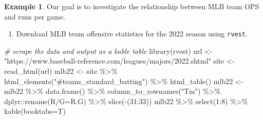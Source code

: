\documentclass[
  11pt,
]{book}
\newenvironment{Shaded}{\begin{snugshade}}{\end{snugshade}}
\newcommand{\AttributeTok}[1]{\textcolor[rgb]{0.77,0.63,0.00}{#1}}
\newcommand{\CommentTok}[1]{\textcolor[rgb]{0.56,0.35,0.01}{\textit{#1}}}
\newcommand{\DecValTok}[1]{\textcolor[rgb]{0.00,0.00,0.81}{#1}}
\newcommand{\FunctionTok}[1]{\textcolor[rgb]{0.00,0.00,0.00}{#1}}
\newcommand{\NormalTok}[1]{#1}
\newcommand{\OtherTok}[1]{\textcolor[rgb]{0.56,0.35,0.01}{#1}}
\newcommand{\SpecialCharTok}[1]{\textcolor[rgb]{0.00,0.00,0.00}{#1}}
\newcommand{\StringTok}[1]{\textcolor[rgb]{0.31,0.60,0.02}{#1}}
\providecommand{\tightlist}{%
  \setlength{\itemsep}{0pt}\setlength{\parskip}{0pt}}
\theoremstyle{definition}
\theoremstyle{definition}
\newtheorem{example}{Example}[chapter]
\theoremstyle{definition}
\theoremstyle{definition}
\theoremstyle{remark}
\begin{document}
\newpage

\begin{example}
Our goal is to investigate the relationship between MLB team OPS and runs per game.
\end{example}

\begin{enumerate}
\def\labelenumi{(\alph{enumi})}
\tightlist
\item
  Download MLB team offensive statistics for the 2022 season using \texttt{rvest}.
\end{enumerate}

\begin{Shaded}
\begin{Highlighting}[]
\CommentTok{\# scrape the data and output as a kable table}
\FunctionTok{library}\NormalTok{(rvest)}
\NormalTok{url }\OtherTok{\textless{}{-}} \StringTok{"https://www.baseball{-}reference.com/leagues/majors/2022.shtml"}
\NormalTok{site }\OtherTok{\textless{}{-}} \FunctionTok{read\_html}\NormalTok{(url)}
\NormalTok{mlb22 }\OtherTok{\textless{}{-}}\NormalTok{ site }\SpecialCharTok{\%\textgreater{}\%} \FunctionTok{html\_elements}\NormalTok{(}\StringTok{"\#teams\_standard\_batting"}\NormalTok{) }\SpecialCharTok{\%\textgreater{}\%} \FunctionTok{html\_table}\NormalTok{()}
\NormalTok{mlb22 }\OtherTok{\textless{}{-}}\NormalTok{ mlb22 }\SpecialCharTok{\%\textgreater{}\%} \FunctionTok{data.frame}\NormalTok{() }\SpecialCharTok{\%\textgreater{}\%} \FunctionTok{column\_to\_rownames}\NormalTok{(}\StringTok{"Tm"}\NormalTok{) }\SpecialCharTok{\%\textgreater{}\%}
\NormalTok{  dplyr}\SpecialCharTok{::}\FunctionTok{rename}\NormalTok{(}\StringTok{\textasciigrave{}}\AttributeTok{R/G}\StringTok{\textasciigrave{}}\OtherTok{=}\NormalTok{R.G) }\SpecialCharTok{\%\textgreater{}\%} \FunctionTok{slice}\NormalTok{(}\SpecialCharTok{{-}}\NormalTok{(}\DecValTok{31}\SpecialCharTok{:}\DecValTok{33}\NormalTok{))}
\NormalTok{mlb22 }\SpecialCharTok{\%\textgreater{}\%} \FunctionTok{select}\NormalTok{(}\DecValTok{1}\SpecialCharTok{:}\DecValTok{8}\NormalTok{) }\SpecialCharTok{\%\textgreater{}\%} \FunctionTok{kable}\NormalTok{(}\AttributeTok{booktabs=}\NormalTok{T)}
\end{Highlighting}
\end{Shaded}
\end{document}
